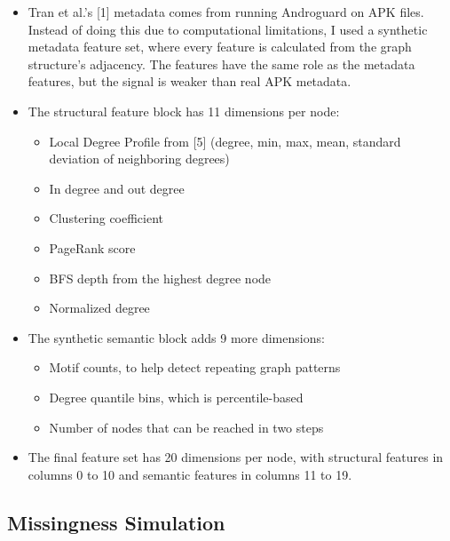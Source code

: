 \documentclass[12pt]{article}
\begin{document}
\begin{itemize}
    \item Tran et al.'s [1] metadata comes from running Androguard on APK files. Instead of doing this due to computational limitations, I used a synthetic metadata feature set, where every feature is calculated from the graph structure's adjacency. The features have the same role as the metadata features, but the signal is weaker than real APK metadata. 
    \item The structural feature block has 11 dimensions per node:
        \begin{itemize}
            \item Local Degree Profile from [5] (degree, min, max, mean, standard deviation of neighboring degrees)
            \item In degree and out degree
            \item Clustering coefficient
            \item PageRank score
            \item BFS depth from the highest degree node
            \item Normalized degree
        \end{itemize}
    \item The synthetic semantic block adds 9 more dimensions:
        \begin{itemize}
            \item Motif counts, to help detect repeating graph patterns
            \item Degree quantile bins, which is percentile-based
            \item Number of nodes that can be reached in two steps
        \end{itemize}
    \item The final feature set has 20 dimensions per node, with structural features in columns 0 to 10 and semantic features in columns 11 to 19.
\end{itemize}

\subsection{Missingness Simulation}
\end{document}
